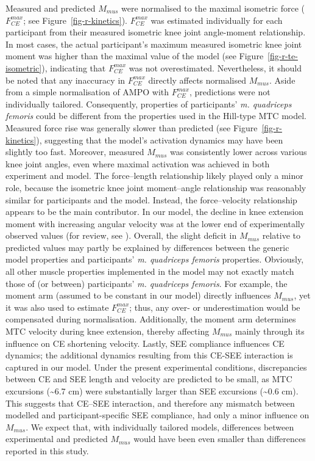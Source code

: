 \documentclass[
  11pt,
  a4paper]{article}
\begin{document}
Measured and predicted \(M_{mus}\) were normalised to the maximal
isometric force (\(F_{CE}^{max}\); see Figure~\ref{fig-r-kinetics}).
\(F_{CE}^{max}\) was estimated individually for each participant from
their measured isometric knee joint angle-moment relationship. In most
cases, the actual participant's maximum measured isometric knee joint
moment was higher than the maximal value of the model (see
Figure~\ref{fig-r-te-isometric}), indicating that \(F_{CE}^{max}\) was
not overestimated. Nevertheless, it should be noted that any inaccuracy
in \(F_{CE}^{max}\) directly affects normalised \(M_{mus}\). Aside from
a simple normalisation of AMPO with \(F_{CE}^{max}\), predictions were
not individually tailored. Consequently, properties of participants'
\emph{m. quadriceps femoris} could be different from the properties used
in the Hill-type MTC model. Measured force rise was generally slower
than predicted (see Figure~\ref{fig-r-kinetics}), suggesting that the
model's activation dynamics may have been slightly too fast. Moreover,
measured \(M_{mus}\) was consistently lower across various knee joint
angles, even where maximal activation was achieved in both experiment
and model. The force--length relationship likely played only a minor
role, because the isometric knee joint moment--angle relationship was
reasonably similar for participants and the model. Instead, the
force--velocity relationship appears to be the main contributor. In our
model, the decline in knee extension moment with increasing angular
velocity was at the lower end of experimentally observed values (for
review, see ).
Overall, the slight deficit in \(M_{mus}\) relative to predicted values
may partly be explained by differences between the generic model
properties and participants' \emph{m. quadriceps femoris} properties.
Obviously, all other muscle properties implemented in the model may not
exactly match those of (or between) participants' \emph{m. quadriceps
femoris}. For example, the moment arm (assumed to be constant in our
model) directly influences \(M_{mus}\), yet it was also used to estimate
\(F_{CE}^{max}\); thus, any over- or underestimation would be
compensated during normalisation. Additionally, the moment arm
determines MTC velocity during knee extension, thereby affecting
\(M_{mus}\) mainly through its influence on CE shortening velocity.
Lastly, SEE compliance influences CE dynamics; the additional dynamics
resulting from this CE-SEE interaction is captured in our model. Under
the present experimental conditions, discrepancies between CE and SEE
length and velocity are predicted to be small, as MTC excursions
(\textasciitilde6.7 cm) were substantially larger than SEE excursions
(\textasciitilde0.6 cm). This suggests that CE--SEE interaction, and
therefore any mismatch between modelled and participant-specific SEE
compliance, had only a minor influence on \(M_{mus}\). We expect that,
with individually tailored models, differences between experimental and
predicted \(M_{mus}\) would have been even smaller than differences
reported in this study.
\end{document}
